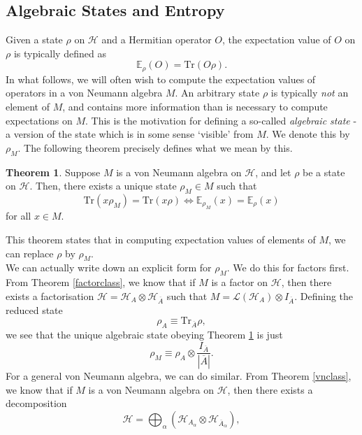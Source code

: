 \documentclass[12pt,a4paper]{report}
\numberwithin{equation}{section}
\newcommand{\ol}[1]{\overline{#1}}
\newcommand{\tr}{\text{Tr}}
\theoremstyle{definition}
\theoremstyle{theorem}
\newtheorem{theorem}{Theorem}[section]
\theoremstyle{theorem}
\theoremstyle{example}
\theoremstyle{definition}
\begin{document}
\subsection{Algebraic States and Entropy}
Given a state $\rho$ on $\mathcal{H}$ and a Hermitian operator $O$, the expectation value of $O$ on $\rho$ is typically defined as
\begin{equation}
	\mathbb{E}_{\rho}(O)=\tr(O\rho).
\end{equation}
In what follows, we will often wish to compute the expectation values of operators in a von Neumann algebra $M$. An arbitrary state $\rho$ is typically \textit{not} an element of $M$, and contains more information than is necessary to compute expectations on $M$. This is the motivation for defining a so-called \textit{algebraic state} - a version of the state which is in some sense `visible' from $M$. We denote this by $\rho_{M}$. The following theorem precisely defines what we mean by this.
\begin{theorem}\label{algst}
	Suppose $M$ is a von Neumann algebra on $\mathcal{H}$, and let $\rho$ be a state on $\mathcal{H}$. Then, there exists a unique state $\rho_{M}\in M$ such that
	\begin{equation}
		\tr(x\rho_{M})=\tr(x\rho)\iff \mathbb{E}_{\rho_{M}}(x)=\mathbb{E}_{\rho}(x)
	\end{equation}
	for all $x\in M$.
\end{theorem}
This theorem states that in computing expectation values of elements of $M$, we can replace $\rho$ by $\rho_{M}$.\\
We can actually write down an explicit form for $\rho_{M}$. We do this for factors first. From Theorem \ref{factorclass}, we know that if $M$ is a factor on $\mathcal{H}$, then there exists a factorisation $\mathcal{H}=\mathcal{H}_{A}\otimes\mathcal{H}_{\ol{A}}$ such that $M=\mathcal{L}(\mathcal{H}_{A})\otimes I_{\ol{A}}$. Defining the reduced state
\begin{equation}
	\rho_{A}\equiv\tr_{\ol{A}}\rho,
\end{equation} 
we see that the unique algebraic state obeying Theorem \ref{algst} is just
\begin{equation}\label{factalg}
	\rho_{M}\equiv\rho_{A}\otimes\frac{I_{\ol{A}}}{|\ol{A}|}.
\end{equation}
For a general von Neumann algebra, we can do similar. From Theorem \ref{vnclass}, we know that if $M$ is a von Neumann algebra on $\mathcal{H}$, then there exists a decomposition
\begin{equation}\label{decomp1}
	\mathcal{H}=\bigoplus_{\alpha}(\mathcal{H}_{A_{\alpha}}\otimes\mathcal{H}_{\ol{A}_{\alpha}}),
\end{equation}
\end{document}
